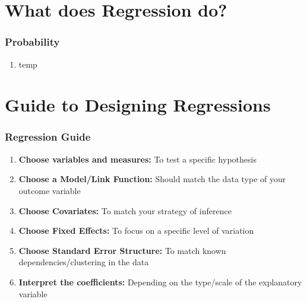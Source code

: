 \documentclass[xcolor=x11names,compress]{beamer}\usepackage[]{graphicx}\usepackage[]{color}
\renewcommand{\(}{\begin{columns}}
\renewcommand{\)}{\end{columns}}
\newcommand{\<}[1]{\begin{column}{#1}}
\renewcommand{\>}{\end{column}}
\begin{document}
\section{What does Regression do?}

\begin{frame}
\frametitle{Probability}
\begin{enumerate}
\item temp
\end{enumerate}
\end{frame}

\section{Guide to Designing Regressions}

\begin{frame}
\frametitle{Regression Guide}
\begin{enumerate}
\item \textbf{Choose variables and measures:} To test a specific hypothesis
\item \textbf{Choose a Model/Link Function:} Should match the data type of your outcome variable
\item \textbf{Choose Covariates:} To match your strategy of inference
\item \textbf{Choose Fixed Effects:} To focus on a specific level of variation
\item \textbf{Choose Standard Error Structure:} To match known dependencies/clustering in the data
\item \textbf{Interpret the coefficients:} Depending on the type/scale of the explanatory variable
\end{enumerate}
\end{frame}
\end{document}
